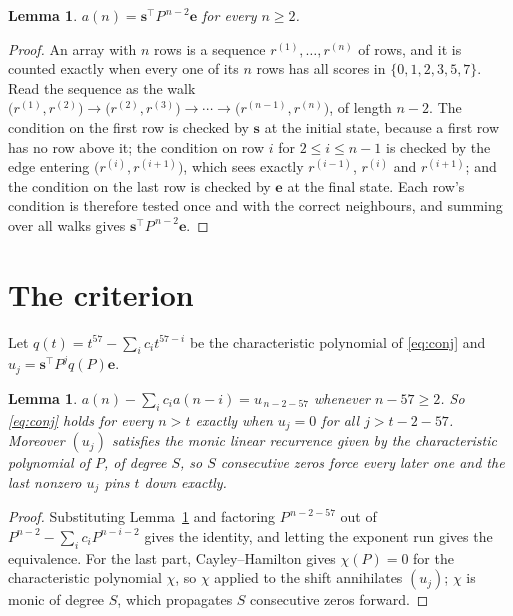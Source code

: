 \documentclass[11pt,a4paper]{article}
\theoremstyle{plain}
\newtheorem{lemma}[theorem]{Lemma}
\theoremstyle{definition}
\begin{document}
\begin{lemma}\label{lem:walk}
$a(n)=\mathbf{s}^{\!\top}P^{\,n-2}\mathbf{e}$ for every $n\ge2$.
\end{lemma}

\begin{proof}
An array with $n$ rows is a sequence $r^{(1)},\dots,r^{(n)}$ of rows, and it is counted
exactly when every one of its $n$ rows has all scores in $\{0,1,2,3,5,7\}$. Read the sequence as the
walk $\bigl(r^{(1)},r^{(2)}\bigr)\to\bigl(r^{(2)},r^{(3)}\bigr)\to\cdots\to
\bigl(r^{(n-1)},r^{(n)}\bigr)$, of length $n-2$. The condition on the first row is
checked by $\mathbf{s}$ at the initial state, because a first row has no row above it; the
condition on row $i$ for $2\le i\le n-1$ is checked by the edge entering
$\bigl(r^{(i)},r^{(i+1)}\bigr)$, which sees exactly $r^{(i-1)}$, $r^{(i)}$ and
$r^{(i+1)}$; and the condition on the last row is checked by $\mathbf{e}$ at the final
state. Each row's condition is therefore tested once and with the correct neighbours, and
summing over all walks gives $\mathbf{s}^{\!\top}P^{\,n-2}\mathbf{e}$.
\end{proof}

\section{The criterion}

Let $q(t)=t^{57}-\sum_i c_i t^{57-i}$ be the characteristic polynomial of
\eqref{eq:conj} and $u_j=\mathbf{s}^{\!\top}P^{j}q(P)\mathbf{e}$.

\begin{lemma}\label{lem:crit}
$a(n)-\sum_i c_i a(n-i)=u_{\,n-2-57}$ whenever $n-57\ge2$. So \eqref{eq:conj}
holds for every $n>t$ exactly when $u_j=0$ for all $j>t-2-57$. Moreover $(u_j)$
satisfies the monic linear recurrence given by the characteristic polynomial of $P$, of
degree $S$, so $S$ consecutive zeros force every later one and the last nonzero $u_j$ pins
$t$ down exactly.
\end{lemma}

\begin{proof}
Substituting Lemma~\ref{lem:walk} and factoring $P^{\,n-2-57}$ out of
$P^{n-2}-\sum_i c_i P^{n-i-2}$ gives the identity, and letting the exponent run gives the
equivalence. For the last part, Cayley--Hamilton gives $\chi(P)=0$ for the characteristic
polynomial $\chi$, so $\chi$ applied to the shift annihilates $(u_j)$; $\chi$ is monic of
degree $S$, which propagates $S$ consecutive zeros forward.
\end{proof}
\end{document}
